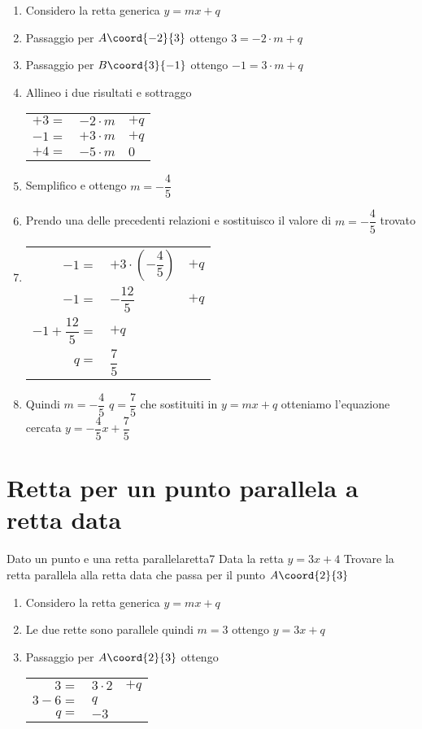 \begin{enumerate}
	\item Considero la retta generica $y=mx+q$
	\item Passaggio per $A\coord{-2}{3}$ ottengo $3=-2\cdot m+q$
	\item Passaggio per $B\coord{3}{-1}$ ottengo $-1=3\cdot m+q$
	\item Allineo i due risultati e sottraggo
	\begin{tabular}{rll}
		$+3=$&$-2\cdot m$ &$+q$  \\ 
		$-1=$&$+3\cdot m$ &$+q$  \\ 
		\hline $+4=$&$-5\cdot m$& $0$ \\ 
	\end{tabular} 
	\item Semplifico e ottengo $m=-\dfrac{4}{5}$
	\item Prendo una delle precedenti relazioni e sostituisco il valore di $m=-\dfrac{4}{5}$ trovato
	\item \begin{tabular}{rll}
		$-1=$&$+3\cdot(-\dfrac{4}{5}) $ &$+q$  \\ 
		$-1=$&$-\dfrac{12}{5}$ &$+q$  \\ 
		$-1+\dfrac{12}{5}=$& $+q$  \\ 
		$q=$&$\dfrac{7}{5}$ 
	\end{tabular} 
	\item Quindi $m=-\dfrac{4}{5}$ $q=\dfrac{7}{5}$ che sostituiti in $y=mx+q$ otteniamo l'equazione cercata $y=-\dfrac{4}{5}x+\dfrac{7}{5}$
\end{enumerate}
\section{Retta per un punto parallela a retta data}
\begin{esempiot}{Dato un punto e una retta parallela}{retta7}
	Data la retta $y=3x+4$ Trovare la retta parallela alla retta data che  passa per il punto	$A\coord{2}{3}$
\end{esempiot}
\begin{enumerate}
	\item Considero la retta generica $y=mx+q$
	\item Le due rette sono parallele quindi $m=3$ ottengo $y=3x+q$
	\item Passaggio per $A\coord{2}{3}$ ottengo 
	\begin{tabular}{rll}
	$3=$&$3\cdot 2$&$+q$\\
	$3-6=$&$q$\\
	$q=$&$-3$\\
	\end{tabular}
\end{enumerate}

